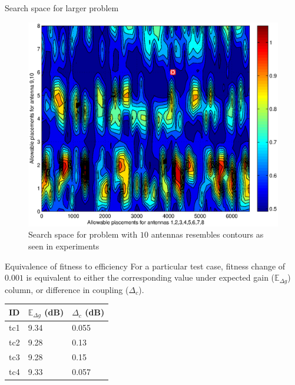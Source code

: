 \documentclass{beamer}
\begin{document}
\begin{frame}{Search space for larger problem}
 \begin{figure}
     \vspace*{-.2cm}
\centering
    \includegraphics[scale=0.5]{../paper/FIG/tc5_contour}%
    \vspace*{-.1cm}
     \caption*{\tiny Search space for problem with $10$ antennas resembles contours as seen in experiments}
\end{figure}
\end{frame}


\begin{frame}{Equivalence of fitness to efficiency}
    \small For a particular test case, fitness change of $0.001$ is equivalent to either the corresponding value under expected gain ($\mathbb E_{\Delta g}$) column, or difference in coupling ($\Delta_c$).
    \begin{table}
        \centering
        \begin{threeparttable}
            \begin{tabular}{|C{1cm}|C{2.5cm}|C{2.5cm}|} \hline
                ID& $\mathbb E_{\Delta g}$ (dB) & $\Delta_{c}$ (dB) \\ \hline
                tc1 & 9.34 & 0.055 \\ \hline
                tc2 & 9.28 & 0.13 \\ \hline
                tc3 & 9.28 & 0.15 \\ \hline
                tc4 & 9.33 & 0.057 \\
                \hline\end{tabular}
        \end{threeparttable}
    \end{table}
\end{frame}
\end{document}
